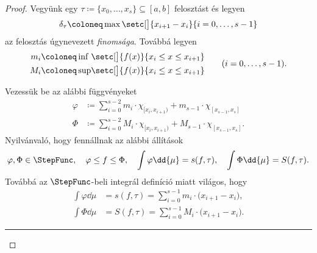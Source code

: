 \documentclass[
]{elteikthesis}[2024/04/26]
\begin{document}
	\begin{proof}
		Vegyünk egy \( \tau \coloneq \{ x_0, \dots, x_s \} \subseteq [a, b] \) felosztást és legyen
		\[
			\delta_\tau \coloneq \max \setc[\big]{ x_{i + 1} - x_i }{ i = 0,\dots, s-1 }
		\]
		az felosztás úgynevezett \emph{finomsága}. Továbbá legyen
		\[
			\begin{alignedat}{2}
				m_i &\coloneq \inf && \setc[\big]{ f(x) }{ x_i \leq x \leq x_{i + 1} } \\
				M_i &\coloneq \sup && \setc[\big]{ f(x) }{ x_i \leq x \leq x_{i + 1} }
			\end{alignedat}
			\qquad (i = 0,\dots,s-1).
		\]
		
		\newpage
		
		Vezessük be az alábbi függvényeket
		\begin{align*}
			\varphi &\coloneq
			\sum_{i=0}^{s-2} m_i     {\cdot} \chi_{[x_i, x_{i+1})}
			+                m_{s-1} {\cdot} \chi_{[x_{s-1}, x_s]} \\[6pt]
			\Phi &\coloneq
			\sum_{i=0}^{s-2} M_i     {\cdot} \chi_{[x_i, x_{i+1})}
			+                M_{s-1} {\cdot} \chi_{[x_{s-1}, x_s]}.
		\end{align*}
		Nyilvánvaló, hogy fennállnak az alábbi állítások
		\[
			\varphi, \Phi \in \StepFunc, \quad
			\varphi \leq f \leq \Phi, \quad
			\int \varphi \dd{\mu} = s(f, \tau), \quad
			\int \Phi \dd{\mu} = S(f, \tau).
		\]
		Továbbá az \( \StepFunc \)-beli integrál definíció miatt világos, hogy
		\begin{align*}
			\int \varphi \dd{\mu} &= 
			s(f, \tau) = 
			\sum_{i=0}^{s-1} m_i {\cdot} \bigl( x_{i+1} - x_i \bigr), \\
			\int \Phi \dd{\mu} &= 
			S(f, \tau) = 
			\sum_{i=0}^{s-1} M_i {\cdot} \bigl( x_{i+1} - x_i \bigr).
		\end{align*}
		
		\vspace{6pt}
		\hrule
		\vspace{9pt}
		

\end{proof}
\end{document}

